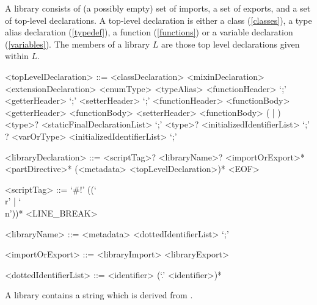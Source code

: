 \documentclass[makeidx]{article}
\begin{document}
{\LMHash{}%
A library consists of (a possibly empty) set of imports, a set of exports,
and a set of top-level declarations.
A top-level declaration is either a class (\ref{classes}),
a type alias declaration (\ref{typedef}),
a function (\ref{functions})
or a variable declaration (\ref{variables}).
The members of a library $L$ are those top level declarations given within $L$.

\begin{grammar}
<topLevelDeclaration> ::= <classDeclaration>
  \alt <mixinDeclaration>
  \alt <extensionDeclaration>
  \alt <enumType>
  \alt <typeAlias>
  \alt \EXTERNAL{} <functionHeader> `;'
  \alt \EXTERNAL{} <getterHeader> `;'
  \alt \EXTERNAL{} <setterHeader> `;'
  \alt <functionHeader> <functionBody>
  \alt <getterHeader> <functionBody>
  \alt <setterHeader> <functionBody>
  \alt (\FINAL{} | \CONST{}) <type>? <staticFinalDeclarationList> `;'
  \alt \LATE{} \FINAL{} <type>? <initializedIdentifierList> `;'
  \alt \LATE? <varOrType> <initializedIdentifierList> `;'

<libraryDeclaration> ::= \gnewline{}
  <scriptTag>? <libraryName>? <importOrExport>* <partDirective>*
  \gnewline{} (<metadata> <topLevelDeclaration>)* <EOF>

<scriptTag> ::= `#!' (\gtilde(`\\r' | `\\n'))* <LINE\_BREAK>

<libraryName> ::= <metadata> \LIBRARY{} <dottedIdentifierList> `;'

<importOrExport> ::= <libraryImport>
  \alt <libraryExport>

<dottedIdentifierList> ::= <identifier> (`.' <identifier>)*
\end{grammar}

\LMHash{}%
A library contains a string which is derived from .


}
\end{document}
